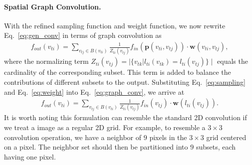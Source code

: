\documentclass[letterpaper]{article} %
\begin{document}
\paragraph{Spatial Graph Convolution.}
With the refined sampling function and weight function, we now rewrite Eq.~\ref{eq:gen_conv} in terms of graph convolution as
\begin{align}
	\label{eq:graph_conv}
	f_{out}(v_{ti}) = \sum_{v_{tj}\in B(v_{ti})} \frac{1}{Z_{ti}(v_{tj})}f_{in}(\mathbf{p}(v_{ti}, v_{tj}))\cdot \mathbf{w}(v_{ti}, v_{tj}), 
\end{align}
where the normalizing term 
$
Z_{ti}(v_{tj}) = \mid\{ v_{tk} |  l_{ti}(v_{tk}) = l_{ti}(v_{tj})\}\mid
$
equals the cardinality of the corresponding subset.
This term is added to balance the contributions of different subsets to the output.
Substituting Eq.~\ref{eq:sampling} and Eq.~\ref{eq:weight} into Eq.~\ref{eq:graph_conv}, we arrive at
\begin{align}
		\label{eq:graph_conv_simplify}
		f_{out}(v_{ti}) = \sum_{v_{tj}\in B(v_{ti})} \frac{1}{Z_{ti}(v_{tj})}f_{in}(v_{tj})\cdot \mathbf{w}(l_{ti}(v_{tj})).
\end{align}
It is worth noting this formulation can resemble the standard 2D convolution if we treat a image as a regular 2D grid.
For example, to resemble a $ 3\times 3 $ convolution operation, we have a neighbor of $ 9 $ pixels in the $ 3\times 3 $ grid centered on a pixel. 
The neighbor set should then be partitioned into $ 9 $ subsets, each having one pixel.
\end{document}
